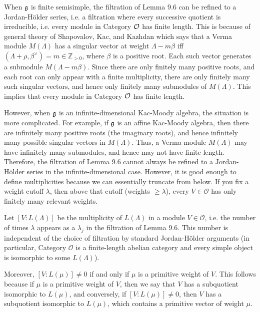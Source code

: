 \documentclass[12pt]{article}
\begin{document}
\begin{remark}
    When $\mathfrak{g}$ is finite semisimple, the filtration of Lemma 9.6 can be refined to a Jordan-Hölder series, i.e. a filtration where every successive quotient is irreducible, i.e. every module in Category ${\mathcal{O}}$ has finite length. This is because of general theory of Shapovalov, Kac, and Kazhdan which says that a Verma module $M(\Lambda)$ has a singular vector at weight $\Lambda - m\beta$ iff $(\Lambda+\rho,\beta^\vee)=m\in\mathbb Z_{>0}$, where $\beta$ is a positive root. Each such vector generates a submodule $M(\Lambda - m\beta)$. Since there are only finitely many positive roots, and each root can only appear with a finite multiplicity, there are only finitely many such singular vectors, and hence only finitely many submodules of $M(\Lambda)$. This implies that every module in Category ${\mathcal{O}}$ has finite length. 
        
    However, when $\mathfrak{g}$ is an infinite-dimensional Kac-Moody algebra, the situation is more complicated. For example, if $\mathfrak{g}$ is an affine Kac-Moody algebra, then there are infinitely many positive roots (the imaginary roots), and hence infinitely many possible singular vectors in $M(\Lambda)$. Thus, a Verma module $M(\Lambda)$ may have infinitely many submodules, and hence may not have finite length. Therefore, the filtration of Lemma 9.6 cannot always be refined to a Jordan-Hölder series in the infinite-dimensional case. However, it is good enough to define multiplicities because we can essentially truncate from below. If you fix a weight cutoff $\lambda$, then above that cutoff (weights $\geq \lambda$), every $V\in\mathcal O$ has only finitely many relevant weights.
\end{remark}

Let $[V:L(\Lambda)]$ be the multiplicity of $L(\Lambda)$ in a module $V \in \mathcal{O}$, i.e. the number of times $\lambda$ appears as a $\lambda_j$ in the filtration of Lemma 9.6. This number is independent of the choice of filtration by standard Jordan-Hölder arguments (in particular, Category $\mathcal{O}$ is a finite-length abelian category and every simple object is isomorphic to some $L(\Lambda)$).

Moreover, $[V:L(\mu)] \neq 0$ if and only if $\mu$ is a primitive weight of $V$. This follows because if $\mu$ is a primitive weight of $V$, then we say that $V$ has a subquotient isomorphic to $L(\mu)$, and conversely, if $[V:L(\mu)] \neq 0$, then $V$ has a subquotient isomorphic to $L(\mu)$, which contains a primitive vector of weight $\mu$.
\end{document}
